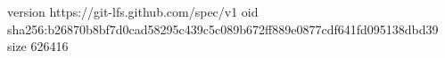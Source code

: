 version https://git-lfs.github.com/spec/v1
oid sha256:b26870b8bf7d0cad58295c439c5c089b672ff889e0877cdf641fd095138dbd39
size 626416

